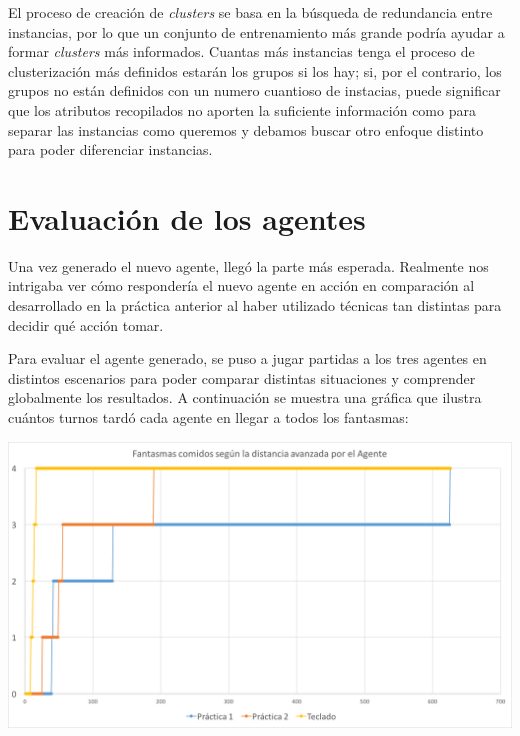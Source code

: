 \documentclass[12pt]{article}
\begin{document}
El proceso de creación de \emph{clusters} se basa en la búsqueda de redundancia entre instancias, por lo que un conjunto de entrenamiento más grande podría ayudar a formar \emph{clusters} más informados. Cuantas más instancias tenga el proceso de clusterización más definidos estarán los grupos si los hay; si, por el contrario, los grupos no están definidos con un numero cuantioso de instacias, puede significar que los atributos recopilados no aporten la suficiente información como para separar las instancias como queremos y debamos buscar otro enfoque distinto para poder diferenciar instancias.

\newpage
\section{Evaluación de los agentes}


Una vez generado el nuevo agente, llegó la parte más esperada. Realmente nos intrigaba ver cómo respondería el nuevo agente en acción en comparación al desarrollado en la práctica anterior al haber utilizado técnicas tan distintas para decidir qué acción tomar.


Para evaluar el agente generado, se puso a jugar partidas a los tres agentes en distintos escenarios para poder comparar distintas situaciones y comprender globalmente los resultados. A continuación se muestra una gráfica que ilustra cuántos turnos tardó cada agente en llegar a todos los fantasmas:

\begin{center}
    \includegraphics[width=15cm]{classicPerformanceComparison}
\end{center}
\end{document}
